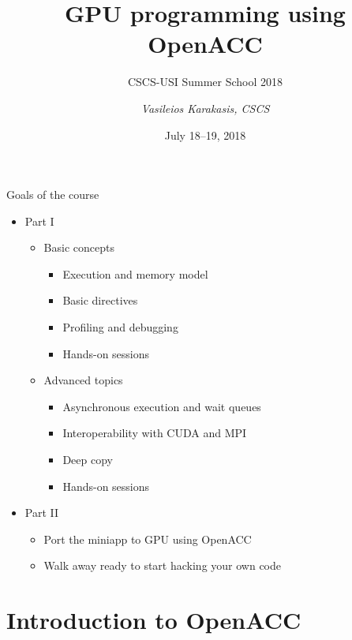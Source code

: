 \documentclass[12pt,aspectratio=169]{beamer}
\author{\emph{Vasileios Karakasis, CSCS}}
\title{GPU programming using OpenACC}
\subtitle{CSCS-USI Summer School 2018}
\date{July 18--19, 2018}
\begin{document}
\cscstitle

\begin{frame}{Goals of the course}
  \begin{itemize}
  \item Part I
    \begin{itemize}
    \item Basic concepts
      \begin{itemize}
      \item Execution and memory model
      \item Basic directives
      \item Profiling and debugging
      \item Hands-on sessions
      \end{itemize}
    \item Advanced topics
      \begin{itemize}
      \item Asynchronous execution and wait queues
      \item Interoperability with CUDA and MPI
      \item Deep copy
      \item Hands-on sessions
      \end{itemize}
    \end{itemize}
  \item  Part II
    \begin{itemize}
    \item Port the miniapp to GPU using OpenACC
    \item Walk away ready to start hacking your own code
    \end{itemize}
  \end{itemize}
\end{frame}

\part{Introduction to OpenACC}
\end{document}
